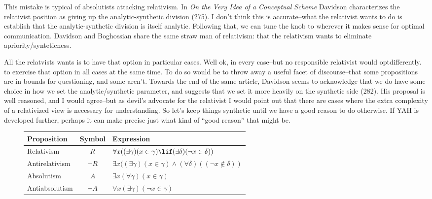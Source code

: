 \documentclass[12pt]{article}
\begin{document}
\begin{flushleft}
This mistake is typical of absolutists attacking relativism.
In \textit{On the Very Idea of a Conceptual Scheme} Davidson characterizes the relativist position as giving up the analytic-synthetic division (275).
I don't think this is accurate--what the relativist wants to do is establish that the analytic-synthetic division is itself analytic.
Following that, we can tune the knob to wherever it makes sense for optimal communication.
Davidson and Boghossian share the same straw man of relativism: that the relativism wants to eliminate apriority/synteticness.

All the relatvists wants is to have that option in particular cases.
Well ok, in every case--but no responsible relativist would optdifferently. to exercise that option in all cases at the same time.
To do so would be to throw away a useful facet of discourse--that some propositions are in-bounds for questioning, and some aren't.
Towards the end of the same article, Davidson seems to acknowledge that we do have some choice in how we set the analytic/synthetic parameter, and suggests that we set it more heavily on the synthetic side (282).
His proposal is well reasoned, and I would agree--but as devil's advocate for the relativist I would point out that there are cases where the extra complexity of a relativized view is necessary for understanding.
So let's keep things synthetic until we have a good reason to do otherwise.
If YAH is developed further, perhaps it can make precise just what kind of ``good reason'' that might be.

\begin{figure}[h]
    \begin{tabular}{l|c|l}
        \hline
        Proposition & Symbol & Expression \\ \hline
        Relativism  & $R$ & $\forall{x}((\exists{\gamma})(x \in \gamma) \lif (\exists{\delta})({\lnot}x \in \delta))$ \\
        Antirelativism & $\neg R$ & $\exists{x}((\exists{\gamma})(x \in \gamma) \land (\forall{\delta})(({\neg}x \notin \delta))$ \\
        Absolutism & $A$ & $\exists{x}(\forall{\gamma})(x \in \gamma)$ \\
        Antiabsolutism & $\neg A$ & $\forall{x}(\exists{\gamma})({\lnot}x \in \gamma)$ \\
    \end{tabular}\\
    \par\bigskip


\end{figure}
\end{flushleft}
\end{document}
